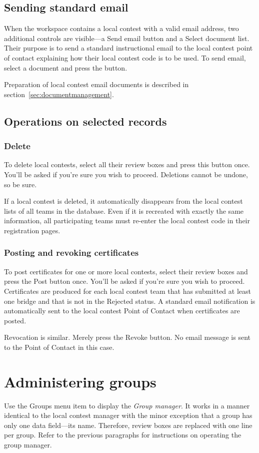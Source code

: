 \documentclass[11pt,letterpaper]{refart}
\def\ui#1{\textsf{#1}}
\begin{document}
\subsection{Sending standard email}
When the workspace contains a local contest with a valid email
address, two additional controls are visible---a \ui{Send email}
button and a \ui{Select document} list. Their purpose is to send a
standard instructional email to the local contest point of contact
explaining how their local contest code is to be used. To send email,
select a document and press the button.

Preparation of local contest email documents is described in
section~\ref{sec:documentmanagement}.

\subsection{Operations on selected records}

\subsubsection{Delete}
To delete local contests, select all their review boxes and press this
button once. You'll be asked if you're sure you wish to
proceed. Deletions cannot be undone, so be sure.

If a local contest is deleted, it automatically disappears from the
local contest lists of all teams in the database. Even if it is
recreated with exactly the same information, all participating teams
must re-enter the local contest code in their registration pages.

\subsubsection{Posting and revoking certificates}
To post certificates for one or more local contests, select their
review boxes and press the Post button once. You'll be asked if you're
sure you wish to proceed. Certificates are produced for each local
contest team that has submitted at least one bridge and that is not in
the Rejected status. A standard email notification is automatically
sent to the local contest Point of Contact when certificates are
posted.

Revocation is similar. Merely press the Revoke button. No email
message is sent to the Point of Contact in this case.

\section{Administering groups}
\label{sec:administeringgroups}
Use the \ui{Groups} menu item to display the \emph{Group manager}. It
works in a manner identical to the local contest manager with the
minor exception that a group has only one data field---its
name. Therefore, review boxes are replaced with one line per
group. Refer to the previous paragraphs for instructions on operating
the group manager.
\end{document}
